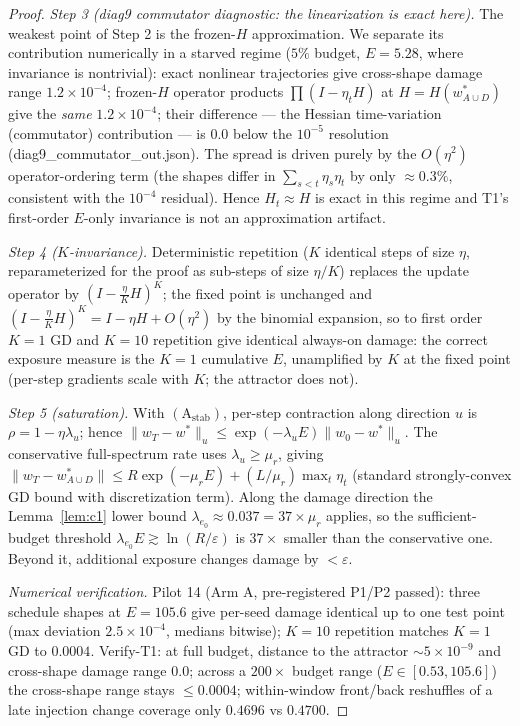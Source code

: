 \documentclass{article}
\newcommand{\Expo}{E}         %
\newcommand{\lam}{\lambda}
\begin{document}
\begin{proof}[Proof]
\emph{Step 3 (diag9 commutator diagnostic: the linearization is exact here).} The weakest point
of Step 2 is the frozen-$H$ approximation. We separate its contribution numerically in a
starved regime ($5\%$ budget, $\Expo=5.28$, where invariance is nontrivial): exact nonlinear
trajectories give cross-shape damage range $1.2\times10^{-4}$; frozen-$H$ operator products
$\prod(I-\eta_t H)$ at $H=H(w^*_{A\cup D})$ give the \emph{same} $1.2\times10^{-4}$; their
difference --- the Hessian time-variation (commutator) contribution --- is $0.0$ below the
$10^{-5}$ resolution (diag9\_commutator\_out.json). The spread is driven purely by the
$O(\eta^2)$ operator-ordering term (the shapes differ in $\sum_{s<t}\eta_s\eta_t$ by only
$\approx0.3\%$, consistent with the $10^{-4}$ residual). Hence $H_t\approx H$ is exact in this
regime and T1's first-order $\Expo$-only invariance is not an approximation artifact.

\emph{Step 4 ($K$-invariance).} Deterministic repetition ($K$ identical steps of size $\eta$,
reparameterized for the proof as sub-steps of size $\eta/K$) replaces the update operator by $(I-\frac{\eta}{K}H)^K$; the fixed point is unchanged
and $(I-\frac{\eta}{K}H)^K=I-\eta H+O(\eta^2)$ by the binomial expansion, so to first order
$K=1$ GD and $K=10$ repetition give identical always-on damage: the correct exposure measure is
the $K{=}1$ cumulative $\Expo$, unamplified by $K$ at the fixed point (per-step gradients scale with $K$; the attractor does not).

\emph{Step 5 (saturation).} With $(\mathrm{A}_{\mathrm{stab}})$, per-step contraction along
direction $u$ is $\rho=1-\eta\lambda_u$; hence
$\|w_T-w^*\|_u\le\exp(-\lambda_u\Expo)\|w_0-w^*\|_u$. The conservative full-spectrum rate uses
$\lambda_u\ge\mu_r$, giving $\|w_T-w^*_{A\cup D}\|\le R\exp(-\mu_r\Expo)+(L/\mu_r)\max_t\eta_t$
(standard strongly-convex GD bound with discretization term). Along the damage direction the
Lemma~\ref{lem:c1} lower bound $\lam_{e_0}\approx0.037=37\times\mu_r$ applies, so the
sufficient-budget threshold $\lam_{e_0}\Expo\gtrsim\ln(R/\varepsilon)$ is $37\times$ smaller
than the conservative one. Beyond it, additional exposure changes damage by $<\varepsilon$.

\emph{Numerical verification.} Pilot 14 (Arm A, pre-registered P1/P2 passed): three schedule
shapes at $\Expo=105.6$ give per-seed damage identical up to one test point (max deviation
$2.5\times10^{-4}$, medians bitwise); $K{=}10$ repetition matches $K{=}1$ GD
to $0.0004$. Verify-T1: at full budget, distance to the attractor $\sim5\times10^{-9}$ and
cross-shape damage range $0.0$; across a $200\times$ budget range
($\Expo\in[0.53,105.6]$) the cross-shape range stays $\le0.0004$; within-window front/back
reshuffles of a late injection change coverage only $0.4696$ vs $0.4700$.
\end{proof}
\end{document}
